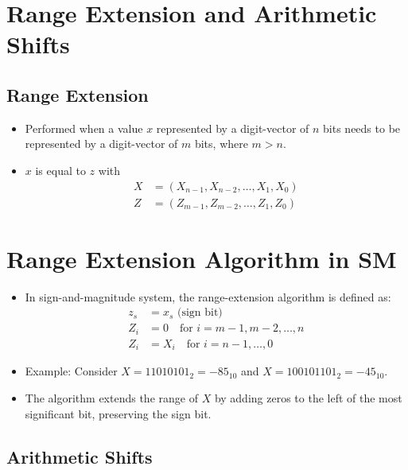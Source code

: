 \documentclass[12pt,openany, tikz,border=10pt]{book}
\begin{document}
  \section{Range Extension
  and Arithmetic Shifts}
\subsection{Range Extension}



\begin{itemize}
  \item[] Performed when a value \( x \) represented by a digit-vector of \( n \) bits needs to be represented by a digit-vector of \( m \) bits, where \( m > n \).
  \item[] \( x \) is equal to \( z \) with
  \begin{align*}
      X &= (X_{n-1}, X_{n-2}, \ldots, X_1, X_0) \\
      Z &= (Z_{m-1}, Z_{m-2}, \ldots, Z_1, Z_0)
  \end{align*}
\end{itemize}

\small \section{Range Extension Algorithm in SM}

\begin{itemize}
    \item[] In sign-and-magnitude system, the range-extension algorithm is defined as:
    \begin{align*}
        z_s &= x_s \text{ (sign bit)} \\
        Z_i &= 0 \quad \text{for } i = m - 1, m - 2, \ldots, n \\
        Z_i &= X_i \quad \text{for } i = n - 1, \ldots, 0
    \end{align*}
    \item[] Example: Consider \( X = 11010101_2 = -85_{10} \) and \( X = 100101101_2 = -45_{10} \).
    \item[] The algorithm extends the range of \( X \) by adding zeros to the left of the most significant bit, preserving the sign bit.
\end{itemize}


\subsection{Arithmetic Shifts}
\end{document}
